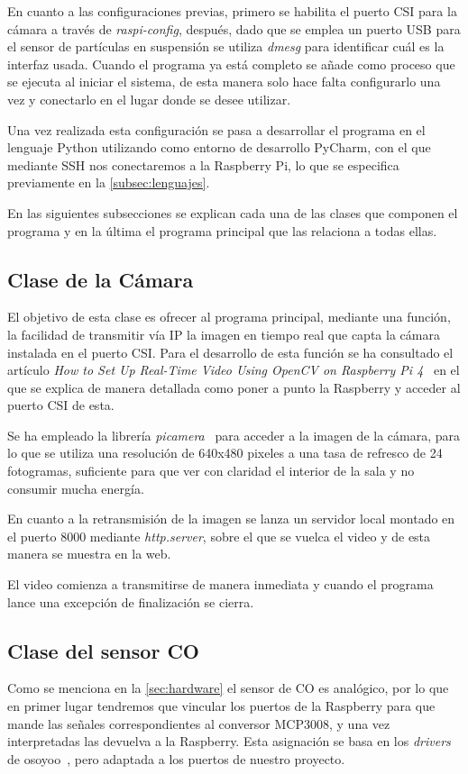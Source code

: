 En cuanto a las configuraciones previas, primero se habilita el puerto CSI para la cámara a través de \textit{raspi-config}, después, dado que se emplea un puerto USB para el sensor de partículas en suspensión se utiliza \textit{dmesg} para identificar cuál es la interfaz usada. Cuando el programa ya está completo se añade como proceso que se ejecuta al iniciar el sistema, de esta manera solo hace falta configurarlo una vez y conectarlo en el lugar donde se desee utilizar.
\pagebreak

Una vez realizada esta configuración se pasa a desarrollar el programa en el lenguaje Python utilizando como entorno de desarrollo PyCharm, con el que mediante SSH nos conectaremos a la Raspberry Pi, lo que se especifica previamente en la \autoref{subsec:lenguajes}.

En las siguientes subsecciones se explican cada una de las clases que componen el programa y en la última el programa principal que las relaciona a todas ellas.

\subsection{Clase de la Cámara}\label{subsec:clase-de-la-cámara}
El objetivo de esta clase es ofrecer al programa principal, mediante una función, la facilidad de transmitir vía IP la imagen en tiempo real que capta la cámara instalada en el puerto CSI. Para el desarrollo de esta función se ha consultado el artículo \textit{How to Set Up Real-Time Video Using OpenCV on Raspberry Pi 4}~\cite{noauthor_how_nodate} en el que se explica de manera detallada como poner a punto la Raspberry y acceder al puerto CSI de esta.

Se ha empleado la librería \textit{picamera}~\cite{noauthor_picamera_nodate} para acceder a la imagen de la cámara, para lo que se utiliza una resolución de 640x480 pixeles a una tasa de refresco de 24 fotogramas, suficiente para que ver con claridad el interior de la sala y no consumir mucha energía.

En cuanto a la retransmisión de la imagen se lanza un servidor local montado en el puerto 8000 mediante \textit{http.server}, sobre el que se vuelca el video y de esta manera se muestra en la web.

El video comienza a transmitirse de manera inmediata y cuando el programa lance una excepción de finalización se cierra.

\subsection{Clase del sensor CO}\label{subsec:clase-del-sensor-co}
Como se menciona en la \autoref{sec:hardware} el sensor de CO es analógico, por lo que en primer lugar tendremos que vincular los puertos de la Raspberry para que mande las señales correspondientes al conversor MCP3008, y una vez interpretadas las devuelva a la Raspberry. Esta asignación se basa en los \textit{drivers} de osoyoo~\cite{osoyoo_osoyoodriver_2021}, pero adaptada a los puertos de nuestro proyecto.


